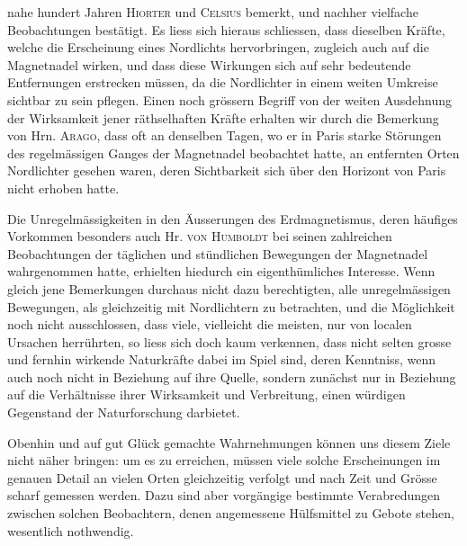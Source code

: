 \noindent nahe hundert Jahren \textsc{Hiorter} und \textsc{Celsius} bemerkt, und nachher vielfache Beobachtungen bestätigt. Es liess sich hieraus schliessen, dass dieselben Kräfte, welche die Erscheinung eines Nordlichts hervorbringen, zugleich auch auf die Magnetnadel wirken, und dass diese Wirkungen sich auf sehr bedeutende Entfernungen erstrecken müssen, da die Nordlichter in einem weiten Umkreise sichtbar zu sein pflegen. Einen noch grössern Begriff von der weiten Ausdehnung der Wirksamkeit jener räthselhaften Kräfte erhalten wir durch die Bemerkung von Hrn. \textsc{Arago}, dass oft an denselben Tagen, wo er in Paris starke Störungen des regelmässigen Ganges der Magnetnadel beobachtet hatte, an entfernten Orten Nordlichter gesehen waren, deren Sichtbarkeit sich über den Horizont von Paris nicht erhoben hatte.

Die Unregelmässigkeiten in den Äusserungen des Erdmagnetismus, deren häufiges Vorkommen besonders auch Hr. \textsc{von Humboldt} bei seinen zahlreichen Beobachtungen der täglichen und stündlichen Bewegungen der Magnetnadel wahrgenommen hatte, erhielten hiedurch ein eigenthümliches Interesse. Wenn gleich jene Bemerkungen durchaus nicht dazu berechtigten, alle unregelmässigen Bewegungen, als gleichzeitig mit Nordlichtern zu betrachten, und die Möglichkeit noch nicht ausschlossen, dass viele, vielleicht die meisten, nur von localen Ursachen herrührten, so liess sich doch kaum verkennen, dass nicht selten grosse und fernhin wirkende Naturkräfte dabei im Spiel sind, deren Kenntniss, wenn auch noch nicht in Beziehung auf ihre Quelle, sondern zunächst nur in Beziehung auf die Verhältnisse ihrer Wirksamkeit und Verbreitung, einen würdigen Gegenstand der Naturforschung darbietet.

Obenhin und auf gut Glück gemachte Wahrnehmungen können uns diesem Ziele nicht näher bringen: um es zu erreichen, müssen viele solche Erscheinungen im genauen Detail an vielen Orten gleichzeitig verfolgt und nach Zeit und Grösse scharf gemessen werden. Dazu sind aber vorgängige bestimmte Verabredungen zwischen solchen Beobachtern, denen angemessene Hülfsmittel zu Gebote stehen, wesentlich nothwendig.

